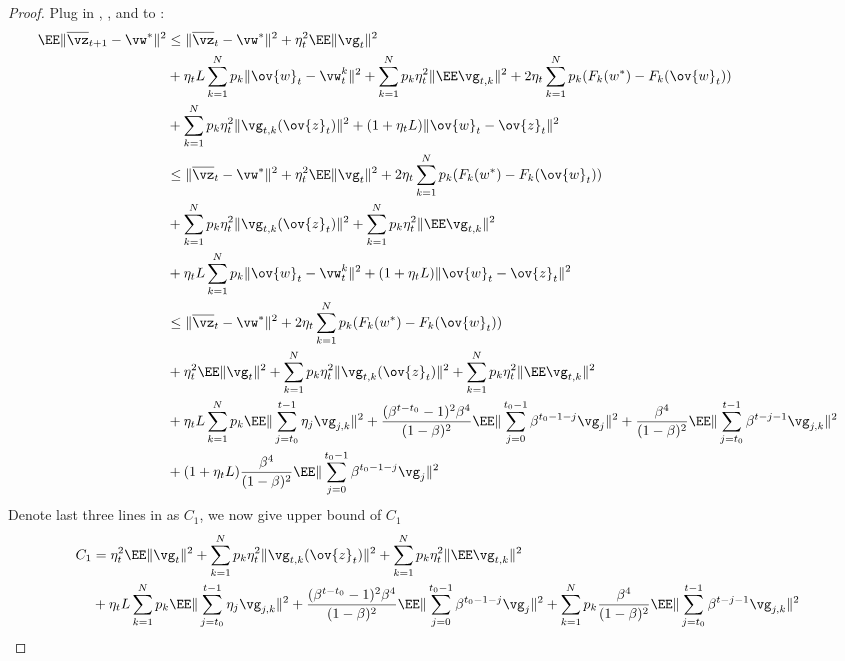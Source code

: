 \begin{proof}
Plug in \eq{\ref{eq:nasgdcvxsm4}}, \eq{\ref{eq:nasgdcvxsm5}}, and \eq{\ref{eq:nasgdcvxsm3}} to \eq{\ref{eq:nasgdcvxsm0}}: 
\begin{align}
		\EE\|\overline{\vz}_{t+1} - \vw^* \|^2  & \leq  \| \overline{\vz}_{t} - \vw^*\|^2 +  \eta_t^2\EE\|\vg_t\|^2  \\
 & + \eta_t L \sum_{k=1}^N p_k  \|\ov{w}_t - \vw^{k}_t\|^2  + \sum_{k=1}^N p_k\eta_t^2 \|\EE \vg_{t,k}\|^2 	 + 2 \eta_{t} \sum_{k=1}^N p_k (F_k(w^*) - F_k(\ov{w}_t)) \nonumber \\
  & +  \sum_{k=1}^N p_k \eta_t^2\|\vg_{t,k}(\ov{z}_t)\|^2 + (1+ \eta_t L)\|\ov{w}_t - \ov{z}_t\|^2 \\
 & \leq  \| \overline{\vz}_{t} - \vw^*\|^2 +  \eta_t^2\EE\|\vg_t\|^2 + 2 \eta_{t} \sum_{k=1}^N p_k (F_k(w^*) - F_k(\ov{w}_t)) \\
 & +  \sum_{k=1}^N p_k \eta_t^2\|\vg_{t,k}(\ov{z}_t)\|^2 + \sum_{k=1}^N p_k\eta_t^2 \|\EE \vg_{t,k}\|^2  	  \nonumber \\
  & + \eta_t L \sum_{k=1}^N p_k  \|\ov{w}_t - \vw^{k}_t\|^2    + (1+ \eta_t L)\|\ov{w}_t - \ov{z}_t\|^2 \\
& \leq  \| \overline{\vz}_{t} - \vw^*\|^2 + 2 \eta_{t} \sum_{k=1}^N p_k (F_k(w^*) - F_k(\ov{w}_t)) \\
 & + \eta_t^2\EE\|\vg_t\|^2  +  \sum_{k=1}^N p_k \eta_t^2\|\vg_{t,k}(\ov{z}_t)\|^2 + \sum_{k=1}^N p_k\eta_t^2 \|\EE \vg_{t,k}\|^2  	  \nonumber \\
  & + \eta_t L \sum_{k=1}^N p_k \EE \|\sum_{j=t_0}^{t-1}\eta_j \vg_{j,k}\|^2 + \frac{(\beta^{t-t_0}-1)^2\beta^4}{(1-\beta)^2}\EE\|\sum_{j=0}^{t_0 - 1}\beta^{t_0-1-j}\vg_j\|^2 + \frac{\beta^4}{(1 - \beta)^2} \EE\|\sum_{j=t_0}^{t-1}\beta^{t-j-1}\vg_{j,k}\|^2   \\
  &   + (1+ \eta_t L)\frac{\beta^4}{(1-\beta)^2}\EE\|\sum_{j=0}^{t_0 - 1}\beta^{t_0-1-j}\vg_j\|^2  \label{eq:nasgdcvxsm6}
\end{align}
Denote last three lines in \eq{\ref{eq:nasgdcvxsm6}} as $C_1$, we now give upper bound of $C_1$
\begin{align*}
C_1 &= 	\eta_t^2\EE\|\vg_t\|^2  +  \sum_{k=1}^N p_k \eta_t^2\|\vg_{t,k}(\ov{z}_t)\|^2 + \sum_{k=1}^N p_k\eta_t^2 \|\EE \vg_{t,k}\|^2  	  \nonumber \\
  &  + \eta_t L \sum_{k=1}^N p_k \EE \|\sum_{j=t_0}^{t-1}\eta_j \vg_{j,k}\|^2 + \frac{(\beta^{t-t_0}-1)^2\beta^4}{(1-\beta)^2}\EE\|\sum_{j=0}^{t_0 - 1}\beta^{t_0-1-j}\vg_j\|^2 + \sum_{k=1}^N p_k\frac{\beta^4}{(1 - \beta)^2} \EE\|\sum_{j=t_0}^{t-1}\beta^{t-j-1}\vg_{j,k}\|^2   \\

\end{align*}
\end{proof}
